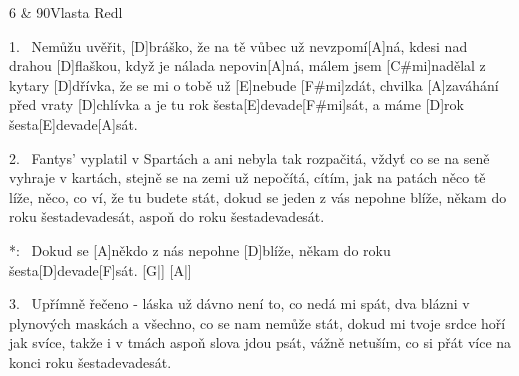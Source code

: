 \begin{song}{6 \& 90}{Vlasta Redl}

\begin{xverse}{1.~}
Nemůžu uvěřit, [D]bráško,
že na tě vůbec už nevzpomí[A]ná,
kdesi nad drahou [D]flaškou,
když je nálada nepovin[A]ná,
málem jsem [C#mi]nadělal z kytary [D]dřívka,
že se mi o tobě už [E]nebude [F#mi]zdát,
chvilka [A]zaváhání před vraty [D]chlívka
a je tu rok šesta[E]devade[F#mi]sát,
a máme [D]rok šesta[E]devade[A]sát.
\end{xverse}

\begin{xverse}{2.~}
Fantys' vyplatil v Spartách
a ani nebyla tak rozpačitá,
vždyť co se na seně vyhraje v kartách,
stejně se na zemi už nepočítá,
cítím, jak na patách něco tě líže,
něco, co ví, že tu budete stát,
dokud se jeden z vás nepohne blíže,
někam do roku šestadevadesát,
aspoň do roku šestadevadesát.
\end{xverse}

\begin{xverse}{*:~}
Dokud se [A]někdo z nás nepohne [D]blíže,
někam do roku šesta[D]devade[F]sát. [G|]{} [A|]{}
\end{xverse}

\begin{xverse}{3.~}
Upřímně řečeno - láska
už dávno není to, co nedá mi spát,
dva blázni v plynových maskách
a všechno, co se nam nemůže stát,
dokud mi tvoje srdce hoří jak svíce,
takže i v tmách aspoň slova jdou psát,
vážně netuším, co si přát více
na konci roku šestadevadesát.
\end{xverse}

\end{song}